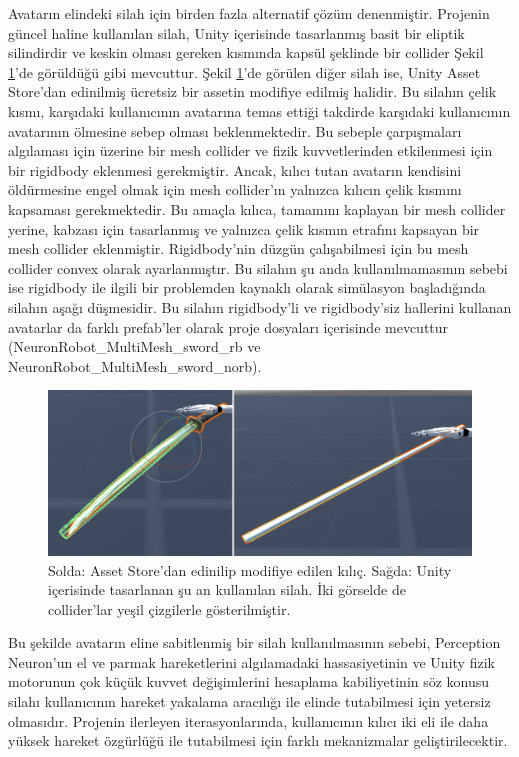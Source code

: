 \documentclass[a4paper, 12pt, titlepage]{article}
\begin{document}
Avatarın elindeki silah için birden fazla alternatif çözüm denenmiştir. Projenin güncel haline
kullanılan silah, Unity içerisinde tasarlanmış basit bir eliptik silindirdir ve keskin olması
gereken kısmında kapsül şeklinde bir collider Şekil \ref{s}’de görüldüğü gibi mevcuttur. Şekil
\ref{s}’de görülen diğer silah ise, Unity Asset Store’dan edinilmiş ücretsiz bir assetin modifiye
edilmiş halidir. Bu silahın çelik kısmı, karşıdaki kullanıcının avatarına temas ettiği takdirde
karşıdaki kullanıcının avatarının ölmesine sebep olması beklenmektedir. Bu sebeple çarpışmaları
algılaması için üzerine bir mesh collider ve fizik kuvvetlerinden etkilenmesi için bir rigidbody
eklenmesi gerekmiştir. Ancak, kılıcı tutan avatarın kendisini öldürmesine engel olmak için mesh
collider’ın yalnızca kılıcın çelik kısmını kapsaması gerekmektedir. Bu amaçla kılıca, tamamını
kaplayan bir mesh collider yerine, kabzası için tasarlanmış ve yalnızca çelik kısmın etrafını
kapsayan bir mesh collider eklenmiştir. Rigidbody’nin düzgün çalışabilmesi için bu mesh collider
convex olarak ayarlanmıştır. Bu silahın şu anda kullanılmamasının sebebi ise rigidbody ile ilgili
bir problemden kaynaklı olarak simülasyon başladığında silahın aşağı düşmesidir. Bu silahın
rigidbody’li ve rigidbody’siz hallerini kullanan avatarlar da farklı prefab’ler olarak proje
dosyaları içerisinde mevcuttur (NeuronRobot\_MultiMesh\_sword\_rb ve
NeuronRobot\_MultiMesh\_sword\_norb).

\begin{figure}[ht!]
    \centering
        \includegraphics[width=6in]{images/s}
    \caption{Solda: Asset Store'dan edinilip modifiye edilen kılıç. Sağda: Unity içerisinde
             tasarlanan şu an kullanılan silah. İki görselde de collider'lar yeşil çizgilerle
             gösterilmiştir.}
    \label{s}
\end{figure}

Bu şekilde avatarın eline sabitlenmiş bir silah kullanılmasının sebebi, Perception Neuron’un el ve
parmak hareketlerini algılamadaki hassasiyetinin ve Unity fizik motorunun çok küçük kuvvet
değişimlerini hesaplama kabiliyetinin söz konusu silahı kullanıcının hareket yakalama aracılığı ile
elinde tutabilmesi için yetersiz olmasıdır. Projenin ilerleyen iterasyonlarında, kullanıcının
kılıcı iki eli ile daha yüksek hareket özgürlüğü ile tutabilmesi için farklı mekanizmalar
geliştirilecektir.
\end{document}
